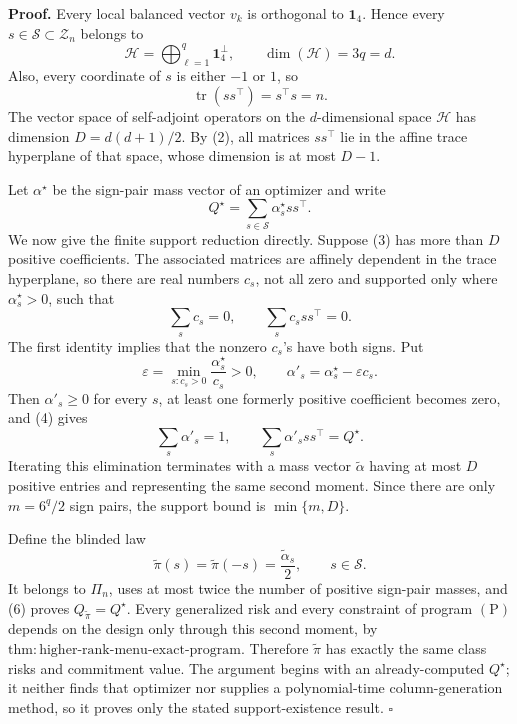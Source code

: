 \textbf{Proof.}
Every local balanced vector \(v_k\) is orthogonal to \(\mathbf1_4\). Hence every \(s\in\mathscr S\subset\mathcal Z_n\) belongs to
\[
\mathcal H=\bigoplus_{\ell=1}^q\mathbf1_4^\perp,
\qquad
\dim(\mathcal H)=3q=d.
\tag{1}
\]
Also, every coordinate of \(s\) is either \(-1\) or \(1\), so
\[
\operatorname{tr}(ss^\top)=s^\top s=n.
\tag{2}
\]
The vector space of self-adjoint operators on the \(d\)-dimensional space \(\mathcal H\) has dimension \(D=d(d+1)/2\). By (2), all matrices \(ss^\top\) lie in the affine trace hyperplane of that space, whose dimension is at most \(D-1\).

Let \(\alpha^\star\) be the sign-pair mass vector of an optimizer and write
\[
Q^\star=\sum_{s\in\mathscr S}\alpha_s^\star ss^\top.
\tag{3}
\]
We now give the finite support reduction directly. Suppose (3) has more than \(D\) positive coefficients. The associated matrices are affinely dependent in the trace hyperplane, so there are real numbers \(c_s\), not all zero and supported only where \(\alpha_s^\star>0\), such that
\[
\sum_sc_s=0,
\qquad
\sum_sc_sss^\top=0.
\tag{4}
\]
The first identity implies that the nonzero \(c_s\)'s have both signs. Put
\[
\varepsilon=\min_{s:c_s>0}\frac{\alpha_s^\star}{c_s}>0,
\qquad
\alpha'_s=\alpha_s^\star-\varepsilon c_s.
\tag{5}
\]
Then \(\alpha'_s\ge0\) for every \(s\), at least one formerly positive coefficient becomes zero, and (4) gives
\[
\sum_s\alpha'_s=1,
\qquad
\sum_s\alpha'_sss^\top=Q^\star.
\tag{6}
\]
Iterating this elimination terminates with a mass vector \(\widetilde\alpha\) having at most \(D\) positive entries and representing the same second moment. Since there are only \(m=6^q/2\) sign pairs, the support bound is \(\min\{m,D\}\).

Define the blinded law
\[
\widetilde\pi(s)=\widetilde\pi(-s)=\frac{\widetilde\alpha_s}{2},
\qquad s\in\mathscr S.
\tag{7}
\]
It belongs to \(\Pi_n\), uses at most twice the number of positive sign-pair masses, and (6) proves \(Q_{\widetilde\pi}=Q^\star\). Every generalized risk and every constraint of program \((\mathrm P)\) depends on the design only through this second moment, by \(\mathrm{thm:higher\text{-}rank\text{-}menu\text{-}exact\text{-}program}\). Therefore \(\widetilde\pi\) has exactly the same class risks and commitment value. The argument begins with an already-computed \(Q^\star\); it neither finds that optimizer nor supplies a polynomial-time column-generation method, so it proves only the stated support-existence result. \(\square\)